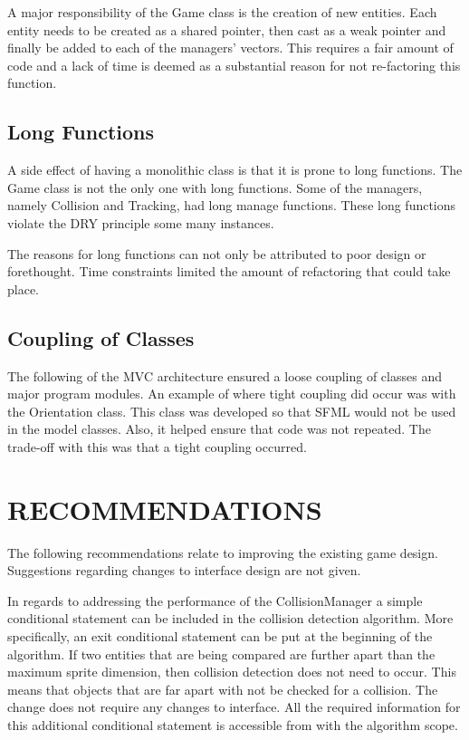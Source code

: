 \documentclass[10pt,twocolumn]{witseiepaper}
\begin{document}
A major responsibility of the Game class is the creation of new entities. Each entity needs to be created as a shared pointer, then cast as a weak pointer and finally be added to each of the managers' vectors. This requires a fair amount of code and a lack of time is deemed as a substantial reason for not re-factoring this function.

\subsection{Long Functions}
A side effect of having a monolithic class is that it is prone to long functions. The Game class is not the only one with long functions. Some of the managers, namely Collision and Tracking, had long manage functions. These long functions violate the DRY principle some many instances.

The reasons for long functions can not only be attributed to poor design or forethought. Time constraints limited the amount of refactoring that could take place. 

\subsection{Coupling of Classes}
The following of the MVC architecture ensured a loose coupling of classes and major program modules. An example of where tight coupling did occur was with the Orientation class. This class was developed so that SFML would not be used in the model classes. Also, it helped ensure that code was not repeated. The trade-off with this was that a tight coupling occurred.

%
\section{RECOMMENDATIONS} %

The following recommendations relate to improving the existing game design. Suggestions regarding changes to interface design are not given.

In regards to addressing the performance of the CollisionManager a simple conditional statement can be included in the collision detection algorithm. More specifically, an exit conditional statement can be put at the beginning of the algorithm. If two entities that are being compared are further apart than the maximum sprite dimension, then collision detection does not need to occur. This means that objects that are far apart with not be checked for a collision. The change does not require any changes to interface. All the required information for this additional conditional statement is accessible from with the algorithm scope.
\end{document}
